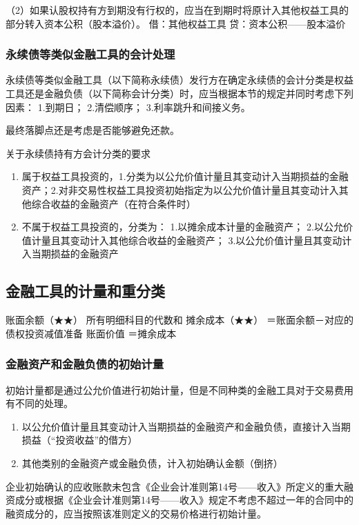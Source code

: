 \documentclass[UTF8,12pt]{ctexart}
\numberwithin{equation}{section} %
\numberwithin{figure}{section}
\numberwithin{table}{section}
\begin{document}
	（2）如果认股权持有方到期没有行权的，应当在到期时将原计入其他权益工具的部分转入资本公积（股本溢价）。
	借：其他权益工具
	贷：资本公积——股本溢价
	
	
	\subsubsection{永续债等类似金融工具的会计处理}
	永续债等类似金融工具（以下简称永续债）发行方在确定永续债的会计分类是权益工具还是金融负债（以下简称会计分类）时，应当根据本节的规定并同时考虑下列因素：
	1.到期日；
	2.清偿顺序；
	3.利率跳升和间接义务。
	
	最终落脚点还是考虑是否能够避免还款。
	
	关于永续债持有方会计分类的要求
	\begin{enumerate}
		\item 属于权益工具投资的，1.分类为以公允价值计量且其变动计入当期损益的金融资产；2.对非交易性权益工具投资初始指定为以公允价值计量且其变动计入其他综合收益的金融资产（在符合条件时）
		
		\item 不属于权益工具投资的，分类为：
		1.以摊余成本计量的金融资产；
		2.以公允价值计量且其变动计入其他综合收益的金融资产；
		3.以公允价值计量且其变动计入当期损益的金融资产
		
	\end{enumerate}
	
	\subsection{金融工具的计量和重分类}
	账面余额（★★）	所有明细科目的代数和
	摊余成本（★★）	＝账面余额－对应的债权投资减值准备
	账面价值	＝摊余成本
	
	\subsubsection{金融资产和金融负债的初始计量}
	初始计量都是通过公允价值进行初始计量，但是不同种类的金融工具对于交易费用有不同的处理。
	\begin{enumerate}
		\item 以公允价值计量且其变动计入当期损益的金融资产和金融负债，直接计入当期损益（“投资收益”的借方）
		
		\item 其他类别的金融资产或金融负债，计入初始确认金额（倒挤）
	\end{enumerate}

	企业初始确认的应收账款未包含《企业会计准则第14号——收入》所定义的重大融资成分或根据《企业会计准则第14号——收入》规定不考虑不超过一年的合同中的融资成分的，应当按照该准则定义的交易价格进行初始计量。
	
\end{document}

